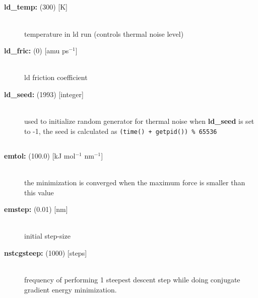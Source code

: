 \subsection{}
\begin{description}
\item[{\bf ld\_temp: }(300) {[K]}]\mbox{}\\
temperature in ld run (controls thermal noise level)
\item[{\bf ld\_fric: }(0) {[amu ps$^{-1}$]}]\mbox{}\\
ld friction coefficient
\item[{\bf ld\_seed: }(1993) {[integer]}]\mbox{}\\
used to initialize random generator for thermal noise
when {\bf ld\_seed} is set to -1, the seed is calculated as
{\tt (time() + getpid()) \% 65536}
\end{description}

\subsection{}
\begin{description}
\item[{\bf emtol: }(100.0) {[kJ mol$^{-1}$ nm$^{-1}$]}]\mbox{}\\
the minimization is converged when the maximum force is smaller than 
this value
\item[{\bf emstep: }(0.01) {[nm]}]\mbox{}\\
initial step-size
\item[{\bf nstcgsteep: }(1000) {[steps]}]\mbox{}\\
frequency of performing 1 steepest descent step while doing
conjugate gradient energy minimization.
\end{description}

